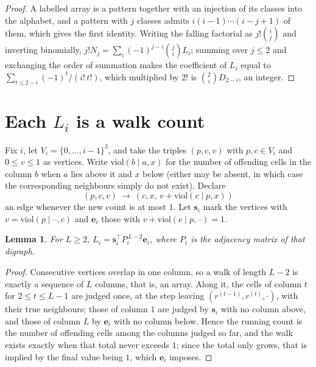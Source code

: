 \documentclass[11pt,a4paper]{article}
\theoremstyle{plain}
\newtheorem{lemma}[theorem]{Lemma}
\theoremstyle{definition}
\begin{document}
\begin{proof}
A labelled array is a pattern together with an injection of its classes into the alphabet,
and a pattern with $j$ classes admits $i(i-1)\cdots(i-j+1)$ of them, which gives the first
identity. Writing the falling factorial as $j!\binom{i}{j}$ and inverting binomially,
$j!N_j=\sum_i(-1)^{j-i}\binom{j}{i}L_i$; summing over $j\le2$ and exchanging the
order of summation makes the coefficient of $L_i$ equal to
$\sum_{t\le2-i}(-1)^t/(i!\,t!)$, which multiplied by $2!$ is
$\binom{2}{i}D_{2-i}$, an integer.
\end{proof}

\section{Each $L_i$ is a walk count}

Fix $i$, let $V_i=\{0,\dots,i-1\}^{3}$, and take the triples $(p,c,v)$ with
$p,c\in V_i$ and $0\le v\le1$ as vertices. Write $\mathrm{viol}(b\mid a,x)$ for the number
of offending cells in the column $b$ when $a$ lies above it and $x$ below (either may be
absent, in which case the corresponding neighbours simply do not exist). Declare
\[
(p,c,v)\ \longrightarrow\ (c,x,\,v+\mathrm{viol}(c\mid p,x))
\]
an edge whenever the new count is at most $1$. Let $\mathbf{s}_i$ mark the vertices with
$v=\mathrm{viol}(p\mid\text{--},c)$ and $\mathbf{e}_i$ those with
$v+\mathrm{viol}(c\mid p,\text{--})=1$.

\begin{lemma}\label{lem:walk}
For $L\ge2$, $L_i=\mathbf{s}_i^{\!\top}P_i^{\,L-2}\mathbf{e}_i$, where $P_i$ is the
adjacency matrix of that digraph.
\end{lemma}

\begin{proof}
Consecutive vertices overlap in one column, so a walk of length $L-2$ is exactly a sequence
of $L$ columns, that is, an array. Along it, the cells of column $t$ for $2\le t\le L-1$ are
judged once, at the step leaving $(r^{(t-1)},r^{(t)},\cdot)$, with their true neighbours;
those of column $1$ are judged by $\mathbf{s}_i$ with no column above, and those of column
$L$ by $\mathbf{e}_i$ with no column below. Hence the running count is the number of
offending cells among the columns judged so far, and the walk exists exactly when that total
never exceeds $1$; since the total only grows, that is implied by the final value being
$1$, which $\mathbf{e}_i$ imposes.
\end{proof}
\end{document}
